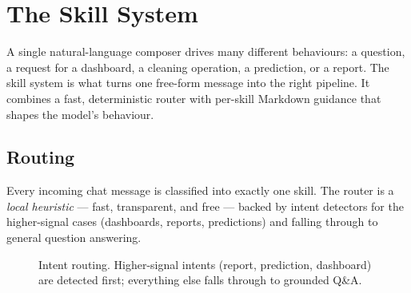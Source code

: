 \chapter{The Skill System}
\label{ch:skills}

A single natural-language composer drives many different behaviours: a question,
a request for a dashboard, a cleaning operation, a prediction, or a report. The
skill system is what turns one free-form message into the right pipeline. It
combines a fast, deterministic router with per-skill Markdown guidance that
shapes the model's behaviour.

\section{Routing}
Every incoming chat message is classified into exactly one skill. The router is a
\emph{local heuristic} --- fast, transparent, and free --- backed by intent
detectors for the higher-signal cases (dashboards, reports, predictions) and
falling through to general question answering.

\begin{figure}[h]
\centering
{}
\caption{Intent routing. Higher-signal intents (report, prediction, dashboard)
are detected first; everything else falls through to grounded Q\&A.}
\label{fig:router}
\end{figure}

